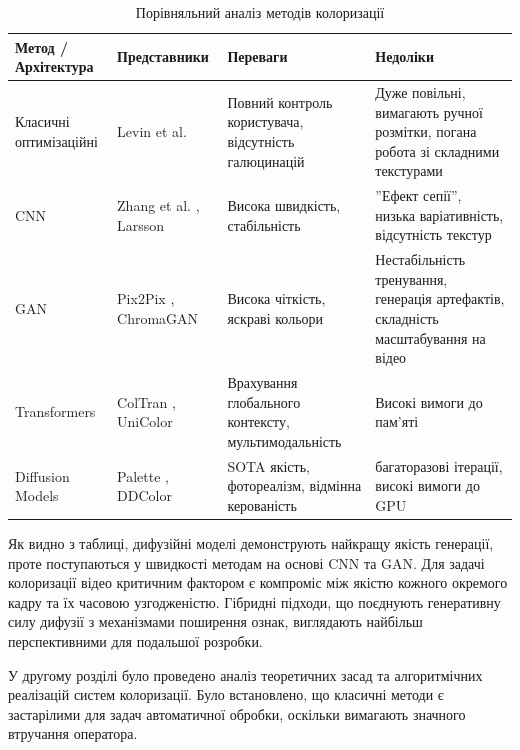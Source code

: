     \begin{table}[ht]
        \centering
        \caption{Порівняльний аналіз методів колоризації}
        \label{tab:comparison}
        \begin{tabular}{|p{}|p{}|p{}|p{}|}
            \hline
            \textbf{Метод / Архітектура} & \textbf{Представники} & \textbf{Переваги} & \textbf{Недоліки} \\
            \hline
            Класичні оптимізаційні & Levin et al.\cite{2004-colorization-using-optimization} & Повний контроль користувача, відсутність галюцинацій & Дуже повільні, вимагають ручної розмітки, погана робота зі складними текстурами \\
            \hline
            CNN & Zhang et al. \cite{2016-colorful-image-colorization}, Larsson \cite{2016-learning-representations-for-automatic-colorization} & Висока швидкість, стабільність & ''Ефект сепії'', низька варіативність, відсутність текстур \\
            \hline
            GAN & Pix2Pix \cite{2017-image-to-image-translation}, ChromaGAN \cite{2020-chromagan} & Висока чіткість, яскраві кольори & Нестабільність тренування, генерація артефактів, складність масштабування на відео \\
            \hline
            Transformers & ColTran \cite{2021-colorization-transformer}, UniColor \cite{2022-unicolor} & Врахування глобального контексту, мультимодальність & Високі вимоги до пам'яті \\
            \hline
            Diffusion Models & Palette \cite{2022-palette-image-to-image-diffusion-models}, DDColor \cite{2023-ddcolor} & SOTA якість, фотореалізм, відмінна керованість & багаторазові ітерації, високі вимоги до GPU \\
            \hline
        \end{tabular}
    \end{table}

    Як видно з таблиці, дифузійні моделі демонструють найкращу якість генерації, проте поступаються у швидкості методам на основі CNN та GAN.
    Для задачі колоризації відео критичним фактором є компроміс між якістю кожного окремого кадру та їх часовою узгодженістю.
    Гібридні підходи, що поєднують генеративну силу дифузії з механізмами поширення ознак, виглядають найбільш перспективними для подальшої розробки.

\chapconclude{\ref{chap:theory}}

    У другому розділі було проведено аналіз теоретичних засад та алгоритмічних реалізацій систем колоризації.
    Було встановлено, що класичні методи є застарілими для задач автоматичної обробки, оскільки вимагають значного втручання оператора.
    
